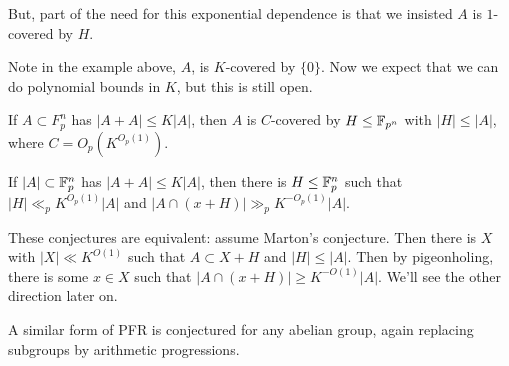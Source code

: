 \documentclass[10pt,a4paper]{article}
\begin{document}
But, part of the need for this exponential dependence is that we insisted $A$ is $1$-covered by $H$.

Note in the example above, $A$, is $K$-covered by $\{0\}$. Now we expect that we can do polynomial bounds in $K$, but this is still open.
\begin{conjecture}[Marton]
 If $A \subset F_p^n$ has $|A+A|\leq K|A|$, then $A$ is $C$-covered by $H\leq \mathbb{F}_{p^n}$ with $|H| \leq |A|$, where $C = O_p(K^{O_p(1)})$.
\end{conjecture}
\begin{conjecture}
 If $|A| \subset \mathbb{F}_p^n$ has $|A+A|\leq K|A|$, then there is $H \leq \mathbb{F}_p^n$ such that $|H|\ll_p K^{O_p(1)}|A|$ and $|A\cap(x+H)|\gg_p K^{-O_p(1)}|A|$.
\end{conjecture}
These conjectures are equivalent: assume Marton's conjecture. Then there is $X$ with $|X| \ll K^{O(1)}$ such that $A \subset X+H$ and $|H| \leq |A|$. Then by pigeonholing, there is some $x \in X$ such that $|A\cap (x+H)| \geq K^{-O(1)}|A|$. We'll see the other direction later on.

A similar form of PFR is conjectured for any abelian group, again replacing subgroups by arithmetic progressions.
\end{document}
